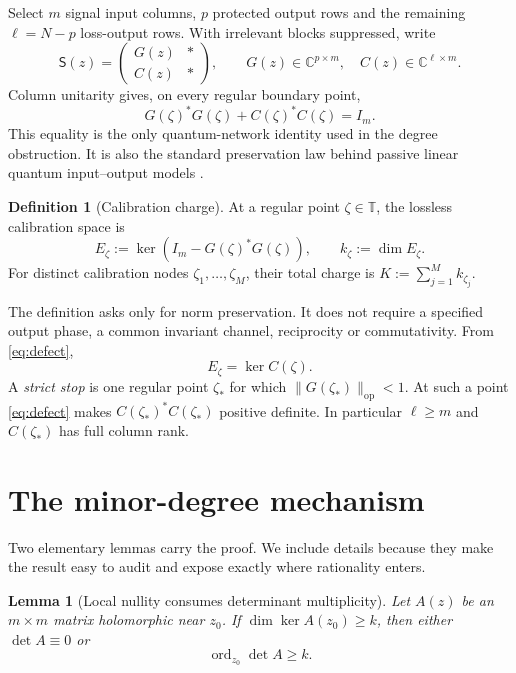 \documentclass[11pt]{article}
\newtheorem{lemma}[theorem]{Lemma}
\theoremstyle{definition}
\newtheorem{definition}[theorem]{Definition}
\theoremstyle{remark}
\newcommand{\C}{\mathbb{C}}
\newcommand{\T}{\mathbb{T}}
\newcommand{\ord}{\operatorname{ord}}
\newcommand{\op}{\mathrm{op}}
\begin{document}
Select $m$ signal input columns, $p$ protected output rows and the remaining
$\ell=N-p$ loss-output rows.  With irrelevant blocks suppressed, write
\begin{equation}\label{eq:partition}
 \mathsf S(z)=
 \begin{pmatrix}
   G(z)& *\\ C(z)& *
 \end{pmatrix},
 \qquad
 G(z)\in\C^{p\times m},\quad C(z)\in\C^{\ell\times m}.
\end{equation}
Column unitarity gives, on every regular boundary point,
\begin{equation}\label{eq:defect}
 G(\zeta)^*G(\zeta)+C(\zeta)^*C(\zeta)=I_m.
\end{equation}
This equality is the only quantum-network identity used in the degree
obstruction.  It is also the standard preservation law behind passive linear
quantum input--output models
\cite{GoughJames2009,GoughZhang2015,NurdinEtAl2016}.

\begin{definition}[Calibration charge]\label{def:charge}
At a regular point $\zeta\in\T$, the lossless calibration space is
\[
 E_\zeta:=\ker\!\left(I_m-G(\zeta)^*G(\zeta)\right),
 \qquad k_\zeta:=\dim E_\zeta.
\]
For distinct calibration nodes $\zeta_1,\ldots,\zeta_M$, their total charge is
$K:=\sum_{j=1}^M k_{\zeta_j}$.
\end{definition}

The definition asks only for norm preservation.  It does not require a
specified output phase, a common invariant channel, reciprocity or
commutativity.  From \eqref{eq:defect},
\begin{equation}\label{eq:kernelidentity}
 E_\zeta=\ker C(\zeta).
\end{equation}
A \emph{strict stop} is one regular point $\zeta_*$ for which
$\|G(\zeta_*)\|_{\op}<1$.  At such a point \eqref{eq:defect} makes
$C(\zeta_*)^*C(\zeta_*)$ positive definite.  In particular $\ell\geq m$ and
$C(\zeta_*)$ has full column rank.

\section{The minor-degree mechanism}

Two elementary lemmas carry the proof.  We include details because they make
the result easy to audit and expose exactly where rationality enters.

\begin{lemma}[Local nullity consumes determinant multiplicity]
\label{lem:nullity}
Let $A(z)$ be an $m\times m$ matrix holomorphic near $z_0$.  If
$\dim\ker A(z_0)\geq k$, then either $\det A\equiv0$ or
\begin{equation}\label{eq:nullityorder}
 \ord_{z_0}\det A\geq k.
\end{equation}
\end{lemma}
\end{document}

